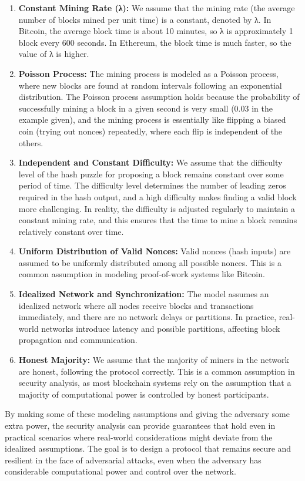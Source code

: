 \begin{enumerate}
	\item \textbf{Constant Mining Rate (λ):} We assume that the mining rate (the average number of blocks mined per unit time) is a constant, denoted by λ. In Bitcoin, the average block time is about 10 minutes, so λ is approximately 1 block every 600 seconds. In Ethereum, the block time is much faster, so the value of λ is higher.
	\item \textbf{Poisson Process:} The mining process is modeled as a Poisson process, where new blocks are found at random intervals following an exponential distribution. The Poisson process assumption holds because the probability of successfully mining a block in a given second is very small (0.03 in the example given), and the mining process is essentially like flipping a biased coin (trying out nonces) repeatedly, where each flip is independent of the others.
	\item \textbf{Independent and Constant Difficulty:} We assume that the difficulty level of the hash puzzle for proposing a block remains constant over some period of time. The difficulty level determines the number of leading zeros required in the hash output, and a high difficulty makes finding a valid block more challenging. In reality, the difficulty is adjusted regularly to maintain a constant mining rate, and this ensures that the time to mine a block remains relatively constant over time.
	\item \textbf{Uniform Distribution of Valid Nonces:} Valid nonces (hash inputs) are assumed to be uniformly distributed among all possible nonces. This is a common assumption in modeling proof-of-work systems like Bitcoin.
	\item \textbf{Idealized Network and Synchronization:} The model assumes an idealized network where all nodes receive blocks and transactions immediately, and there are no network delays or partitions. In practice, real-world networks introduce latency and possible partitions, affecting block propagation and communication.
	\item \textbf{Honest Majority:}  We assume that the majority of miners in the network are honest, following the protocol correctly. This is a common assumption in security analysis, as most blockchain systems rely on the assumption that a majority of computational power is controlled by honest participants.
\end{enumerate}
By making some of these modeling assumptions and giving the adversary some extra power, the security analysis can provide guarantees that hold even in practical scenarios where real-world considerations might deviate from the idealized assumptions. The goal is to design a protocol that remains secure and resilient in the face of adversarial attacks, even when the adversary has considerable computational power and control over the network.

